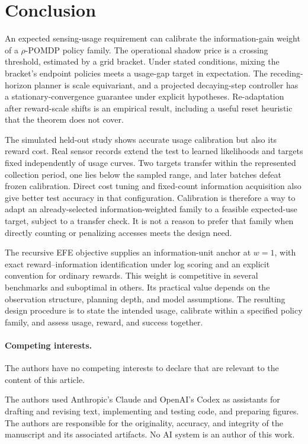 \documentclass[manuscript, screen, review]{jair}
\begin{document}
\section{Conclusion}

An expected sensing-usage requirement can calibrate the information-gain weight of a $\rho$-POMDP policy family. The operational shadow price is a crossing threshold, estimated by a grid bracket. Under stated conditions, mixing the bracket's endpoint policies meets a usage-gap target in expectation. The receding-horizon planner is scale equivariant, and a projected decaying-step controller has a stationary-convergence guarantee under explicit hypotheses. Re-adaptation after reward-scale shifts is an empirical result, including a useful reset heuristic that the theorem does not cover.

The simulated held-out study shows accurate usage calibration but also its reward cost. Real sensor records extend the test to learned likelihoods and targets fixed independently of usage curves. Two targets transfer within the represented collection period, one lies below the sampled range, and later batches defeat frozen calibration. Direct cost tuning and fixed-count information acquisition also give better test accuracy in that configuration. Calibration is therefore a way to adapt an already-selected information-weighted family to a feasible expected-use target, subject to a transfer check. It is not a reason to prefer that family when directly counting or penalizing accesses meets the design need.

The recursive EFE objective supplies an information-unit anchor at $w=1$, with exact reward--information identification under log scoring and an explicit convention for ordinary rewards. This weight is competitive in several benchmarks and suboptimal in others. Its practical value depends on the observation structure, planning depth, and model assumptions. The resulting design procedure is to state the intended usage, calibrate within a specified policy family, and assess usage, reward, and success together.

\paragraph{Competing interests.} The authors have no competing interests to declare that are relevant to the content of this article.

\begin{acks}
The authors used Anthropic's Claude and OpenAI's Codex as assistants for drafting and revising text, implementing and testing code, and preparing figures. The authors are responsible for the originality, accuracy, and integrity of the manuscript and its associated artifacts. No AI system is an author of this work.
\end{acks}
\end{document}
